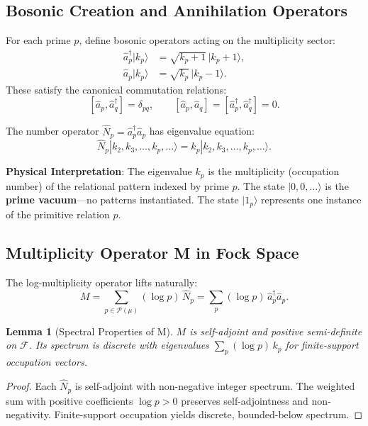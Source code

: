\documentclass[11pt,a4paper]{article}
\theoremstyle{plain}
\newtheorem{lemma}[theorem]{Lemma}
\theoremstyle{definition}
\theoremstyle{remark}
\begin{document}
\subsection{Bosonic Creation and Annihilation Operators}

For each prime \(p\), define bosonic operators acting on the multiplicity sector:
\begin{align}
\hat{a}_p^\dagger |k_p\rangle &= \sqrt{k_p + 1} \, |k_p + 1\rangle, \\
\hat{a}_p |k_p\rangle &= \sqrt{k_p} \, |k_p - 1\rangle.
\end{align}
These satisfy the canonical commutation relations:
\[
[\hat{a}_p, \hat{a}_q^\dagger] = \delta_{pq}, \qquad [\hat{a}_p, \hat{a}_q] = [\hat{a}_p^\dagger, \hat{a}_q^\dagger] = 0.
\]

The number operator \(\hat{N}_p = \hat{a}_p^\dagger \hat{a}_p\) has eigenvalue equation:
\[
\hat{N}_p |k_2, k_3, \ldots, k_p, \ldots\rangle = k_p |k_2, k_3, \ldots, k_p, \ldots\rangle.
\]

\textbf{Physical Interpretation}: The eigenvalue \(k_p\) is the multiplicity (occupation number) of the relational pattern indexed by prime \(p\). The state \(|0,0,\ldots\rangle\) is the \textbf{prime vacuum}---no patterns instantiated. The state \(|1_p\rangle\) represents one instance of the primitive relation \(p\).

\subsection{Multiplicity Operator M in Fock Space}

The log-multiplicity operator lifts naturally:
\[
M = \sum_{p \in \mathcal{P}(\mu)} (\log p) \, \hat{N}_p = \sum_p (\log p) \, \hat{a}_p^\dagger \hat{a}_p.
\]

\begin{lemma}[Spectral Properties of M]
\(M\) is self-adjoint and positive semi-definite on \(\mathcal{F}\). Its spectrum is discrete with eigenvalues \(\sum_p (\log p) \, k_p\) for finite-support occupation vectors.
\end{lemma}

\begin{proof}
Each \(\hat{N}_p\) is self-adjoint with non-negative integer spectrum. The weighted sum with positive coefficients \(\log p > 0\) preserves self-adjointness and non-negativity. Finite-support occupation yields discrete, bounded-below spectrum.
\end{proof}
\end{document}
